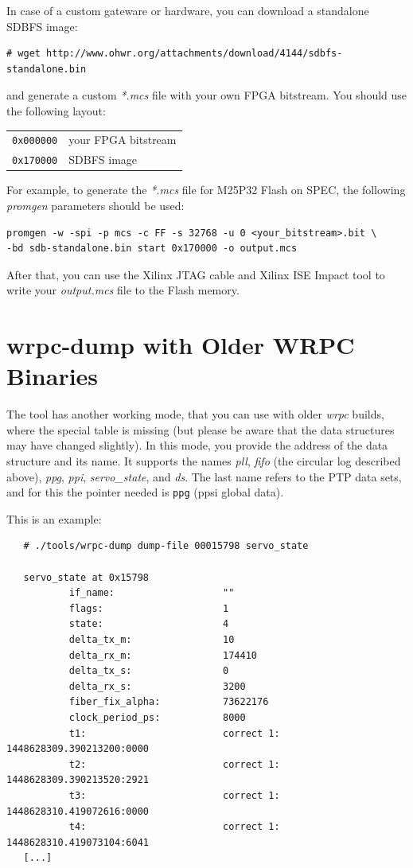 \documentclass[a4paper, 12pt]{article}
\newcommand{\code}[1]{\texttt{#1}}
\newcommand{\codeHook}[1]{\mbox{\ttfamily\MakeTextUppercase{#1}}}
\begin{document}
In case of a custom gateware or hardware, you can download a standalone
\codeHook{sdbfs} image:
\begin{lstlisting}
# wget http://www.ohwr.org/attachments/download/4144/sdbfs-standalone.bin
\end{lstlisting}
and generate a custom \textit{*.mcs} file with your own FPGA bitstream. You should
use the following layout:
\begin{longtable}{  p{3cm}  p{6cm} }
\code{0x000000} & your FPGA bitstream \\
\code{0x170000} & \codeHook{sdbfs} image\\
\end{longtable}
For example, to generate the \textit{*.mcs} file for M25P32 Flash on \codeHook{spec}, the
following \textit{promgen} parameters should be used:
\begin{lstlisting}
promgen -w -spi -p mcs -c FF -s 32768 -u 0 <your_bitstream>.bit \
-bd sdb-standalone.bin start 0x170000 -o output.mcs
\end{lstlisting}

After that, you can use the Xilinx JTAG cable and Xilinx ISE Impact tool to
write your \textit{output.mcs} file to the Flash memory.

\label{wrpc-dump with Older WRPC Binaries}
\section{wrpc-dump with Older WRPC Binaries}

The tool has another working mode, that you can use with older
\textit{wrpc} builds, where the special table is missing (but please be
aware that the data structures may have changed slightly).  In this
mode, you provide the address of the data structure and its name. It
supports the names \textit{pll}, \textit{fifo} (the circular log described
above), \textit{ppg}, \textit{ppi}, \textit{servo\_state}, and \textit{ds}. The last name
refers to the PTP data sets, and for this the pointer needed is
\texttt{ppg} (ppsi global data).

This is an example:

\begin{lstlisting}
   # ./tools/wrpc-dump dump-file 00015798 servo_state

   servo_state at 0x15798
           if_name:                   ""
           flags:                     1
           state:                     4
           delta_tx_m:                10
           delta_rx_m:                174410
           delta_tx_s:                0
           delta_rx_s:                3200
           fiber_fix_alpha:           73622176
           clock_period_ps:           8000
           t1:                        correct 1: 1448628309.390213200:0000
           t2:                        correct 1: 1448628309.390213520:2921
           t3:                        correct 1: 1448628310.419072616:0000
           t4:                        correct 1: 1448628310.419073104:6041
   [...]
\end{lstlisting}
\end{document}
